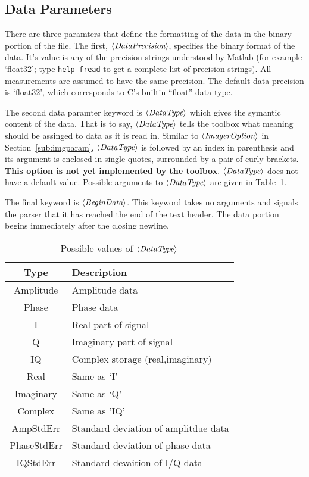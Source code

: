 \documentclass[12pt]{article}
\newcommand{\keyword}[1]{\mbox{$\left<\mbox{\it #1}\right>$}\/}
\begin{document}

\subsection{Data Parameters}
\label{sub:dataparam}

There are three paramters that define the formatting of the data in the
binary portion of the file.  The first, \keyword{DataPrecision},
specifies the binary format of the data.  It's value is any of the
precision strings understood by Matlab (for example `float32'; type
{\tt help fread} to get a complete list of precision strings).  All
measurements are assumed to have the same precision.  The default data
precision is `float32', which corresponds to C's builtin ``float''
data type.

The second data paramter keyword is \keyword{DataType} which gives the
symantic content of the data.  That is to say, \keyword{DataType}
tells the toolbox what meaning should be assinged to data as it is
read in.  Similar to \keyword{ImagerOption} in
Section~\ref{sub:imgparam}, \keyword{DataType} is followed by an index
in parenthesis and its argument is enclosed in single quotes,
surrounded by a pair of curly brackets.
{\bf This option is not yet implemented by the toolbox}.
\keyword{DataType} does not have a default value.  Possible arguments
to \keyword{DataType} are given in Table~\ref{tbl:datatype}.

The final keyword is \keyword{BeginData}.  This keyword takes no
arguments and signals the parser that it has reached the end of the
text header.  The data portion begins immediately after the closing
newline.

\begin{table}
\begin{center}
\begin{tabular}{|c|l|}
\hline
Type & Description \\ \hline
\hline
Amplitude   & Amplitude data \\ \hline
Phase       & Phase data \\ \hline
I           & Real part of signal \\ \hline
Q           & Imaginary part of signal \\ \hline
IQ          & Complex storage (real,imaginary) \\ \hline
Real        & Same as `I' \\ \hline
Imaginary   & Same as `Q' \\ \hline
Complex     & Same as 'IQ' \\ \hline
AmpStdErr   & Standard deviation of amplitdue data \\ \hline
PhaseStdErr & Standard deviation of phase data \\ \hline
IQStdErr    & Standard devaition of I/Q data \\ \hline
\end{tabular}
\end{center}
\caption{Possible values of \keyword{DataType}}
\label{tbl:datatype}
\end{table}
\end{document}
